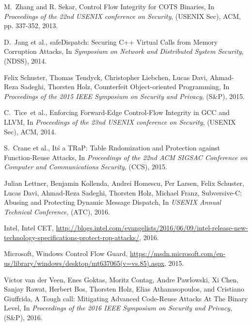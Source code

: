 \documentclass[11pt,a4paper,bibtotoc,idxtotoc,headsepline,footsepline,footexclude,BCOR12mm,DIV13]{scrbook}
\begin{document}
		
		
	


  \clearemptydoublepage
  
  
\begin{thebibliography}{30}



M.~Zhang and R. Sekar, {Control Flow Integrity for COTS Binaries}, In
\emph{Proceedings of the 22nd USENIX conference on Security}, (USENIX Sec), ACM, pp. 337-352, 2013.

D.~Jang et al., {safeDispatch: Securing C++ Virtual Calls from Memory Corruption Attacks}, In
\emph{Symposium on Network and Distributed System Security}, (NDSS), 2014.

Felix Schuster, Thomas Tendyck, Christopher Liebchen, Lucas Davi, Ahmad-Reza Sadeghi, Thorsten Holz, 
{Counterfeit Object-oriented Programming}, In
\emph{Proceedings of the 2015 IEEE Symposium on Security and Privacy}, (S\&P), 2015.

C.~Tice~et al., {Enforcing Forward-Edge Control-Flow Integrity in GCC and LLVM}, In
\emph{Proceedings of the 23nd USENIX conference on Security}, (USENIX Sec), ACM, 2014.

S.~Crane et al., {It\'s a TRaP: Table Rndomization and Protection against Function-Reuse Attacks}, In
\emph{Proceedings of the 22nd ACM SIGSAC Conference on Computer and Communications Security}, (CCS), 2015.

Julian Lettner, Benjamin Kollenda, Andrei Homescu, Per Larsen, Felix Schuster,
Lucas Davi, Ahmad-Reza Sadeghi, Thorsten Holz, Michael Franz,
{Subversive-C: Abusing and Protecting Dynamic Message Dispatch}, In
\emph{USENIX Annual Technical Conference}, (ATC), 2016.

Intel,
{Intel CET},
\url{http://blogs.intel.com/evangelists/2016/06/09/intel-release-new-technology-specifications-protect-rop-attacks/}, 2016.

Microsoft,
{Windows Control Flow Guard},
\url{https://msdn.microsoft.com/en-us/library/windows/desktop/mt637065(v=vs.85).aspx}, 2015.

Victor van der Veen, Enes Goktas, Moritz Contag, Andre Pawlowski, Xi Chen, Sanjay Rawat, 
Herbert Bos, Thorsten Holz, Elias Athanasopoulos, and Cristiano Giuffrida,
{A Tough call: Mitigating Advanced Code-Reuse Attacks At The Binary Level}, In
\emph{Proceedings of the 2016 IEEE Symposium on Security and Privacy}, (S\&P), 2016.


\end{thebibliography}
\end{document}
